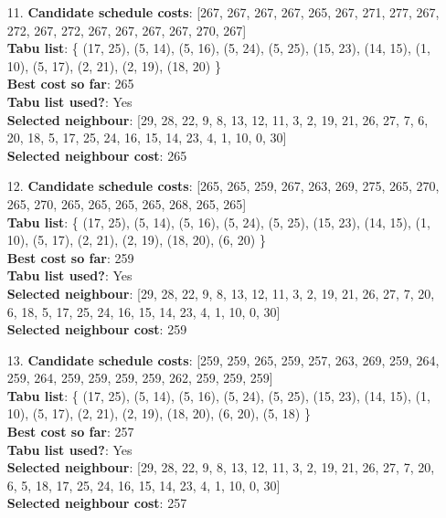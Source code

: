 \documentclass[fleqn]{article}
\begin{document}
\begin{itemize}
    \item[11.] \textbf{Candidate schedule costs}: [267, 267, 267, 267, 265, 267, 271, 277, 267, 272, 267, 272, 267, 267, 267, 267, 270, 267] \\
    \textbf{Tabu list}: \{ (17, 25), (5, 14), (5, 16), (5, 24), (5, 25), (15, 23), (14, 15), (1, 10), (5, 17), (2, 21), (2, 19), (18, 20) \} \\
    \textbf{Best cost so far}: 265 \\
    \textbf{Tabu list used?}: Yes \\
    \textbf{Selected neighbour}: [29, 28, 22, 9, 8, 13, 12, 11, 3, 2, 19, 21, 26, 27, 7, 6, 20, 18, 5, 17, 25, 24, 16, 15, 14, 23, 4, 1, 10, 0, 30] \\
    \textbf{Selected neighbour cost}: 265
      

    \item[12.] \textbf{Candidate schedule costs}: [265, 265, 259, 267, 263, 269, 275, 265, 270, 265, 270, 265, 265, 265, 265, 268, 265, 265] \\
    \textbf{Tabu list}: \{ (17, 25), (5, 14), (5, 16), (5, 24), (5, 25), (15, 23), (14, 15), (1, 10), (5, 17), (2, 21), (2, 19), (18, 20), (6, 20) \} \\
    \textbf{Best cost so far}: 259 \\
    \textbf{Tabu list used?}: Yes \\
    \textbf{Selected neighbour}: [29, 28, 22, 9, 8, 13, 12, 11, 3, 2, 19, 21, 26, 27, 7, 20, 6, 18, 5, 17, 25, 24, 16, 15, 14, 23, 4, 1, 10, 0, 30] \\
    \textbf{Selected neighbour cost}: 259
      

    \item[13.] \textbf{Candidate schedule costs}: [259, 259, 265, 259, 257, 263, 269, 259, 264, 259, 264, 259, 259, 259, 259, 262, 259, 259, 259] \\
    \textbf{Tabu list}: \{ (17, 25), (5, 14), (5, 16), (5, 24), (5, 25), (15, 23), (14, 15), (1, 10), (5, 17), (2, 21), (2, 19), (18, 20), (6, 20), (5, 18) \} \\
    \textbf{Best cost so far}: 257 \\
    \textbf{Tabu list used?}: Yes \\
    \textbf{Selected neighbour}: [29, 28, 22, 9, 8, 13, 12, 11, 3, 2, 19, 21, 26, 27, 7, 20, 6, 5, 18, 17, 25, 24, 16, 15, 14, 23, 4, 1, 10, 0, 30] \\
    \textbf{Selected neighbour cost}: 257
      


\end{itemize}
\end{document}
